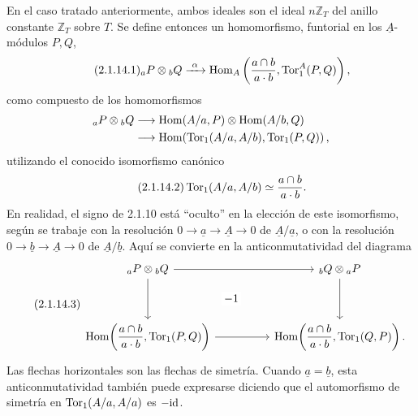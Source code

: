 En el caso tratado anteriormente, ambos ideales son el ideal
$n\mathbb Z_T$ del anillo constante $\mathbb Z_T$ sobre $T$. Se
define entonces un homomorfismo, funtorial en los $\underline A$-módulos
$P,Q$,
\begin{equation}\tag{2.1.14.1}
 {}_{a}P\otimes{}_{b}Q
 \xrightarrow{\ \alpha\ }
 \operatorname{Hom}_{A}
 \left(
   \frac{a\cap b}
        {a\mathbin{\cdot}b},
   \operatorname{Tor}^{A}_1(P,Q)
 \right),
\end{equation}
como compuesto de los homomorfismos
\[
\begin{split}
 {}_{a}P\otimes{}_{b}Q
 &\longrightarrow
 \operatorname{Hom}(A/a,P)
 \otimes
 \operatorname{Hom}(A/b,Q)\\
 &\longrightarrow
 \operatorname{Hom}\!\left(
   \operatorname{Tor}_1(A/a,A/b),
   \operatorname{Tor}_1(P,Q)
 \right),
\end{split}
\]
utilizando el conocido isomorfismo canónico
\begin{equation}\tag{2.1.14.2}
 \operatorname{Tor}_1(A/a,A/b)
 \simeq
 \frac{a\cap b}
      {a\mathbin{\cdot}b}.
\end{equation}
En realidad, el signo de 2.1.10 está ``oculto'' en la elección de este
isomorfismo, según se trabaje con la resolución
$0\longrightarrow\underline a\longrightarrow\underline A
\longrightarrow0$ de $\underline A/\underline a$, o con la
resolución $0\longrightarrow\underline b\longrightarrow\underline A
\longrightarrow0$ de $\underline A/\underline b$. Aquí se convierte
en la anticonmutatividad del diagrama
\begin{equation}\tag{2.1.14.3}
\begin{tikzcd}[column sep=huge,row sep=huge]
 {}_{\underline a}P\otimes{}_{\underline b}Q
   \arrow[r]
   \arrow[d]
   \arrow[rd,phantom,"-1" description]&
 {}_{\underline b}Q\otimes{}_{\underline a}P
   \arrow[d]\\
 \uHom\!\left(
   \dfrac{\underline a\cap\underline b}
         {\underline a\mathbin{\cdot}\underline b},
   \uTor_1(P,Q)
 \right)
   \arrow[r]&
 \uHom\!\left(
   \dfrac{\underline a\cap\underline b}
         {\underline a\mathbin{\cdot}\underline b},
   \uTor_1(Q,P)
 \right).
\end{tikzcd}
\end{equation}
Las flechas horizontales son las flechas de simetría. Cuando
$\underline a=\underline b$, esta anticonmutatividad también puede
expresarse diciendo que el automorfismo de simetría en
$\operatorname{Tor}_1(A/a,A/a)$ es
$-\mathrm{id}$.

